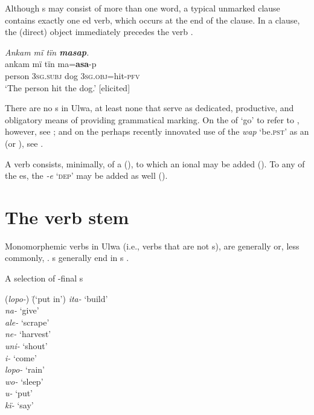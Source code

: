   Although s may consist of more than one word, a typical unmarked  clause contains exactly one ed verb, which occurs at the end of the clause. In a  clause, the  (direct) object immediately precedes the verb .

\ea%
    \label{ex:verbs:1c}
            \textit{Ankam mï tïn \textbf{masap}.}\\
            \gll    ankam  mï      tïn ma=\textbf{asa}-p\\
    person  3\textsc{sg.subj}  dog  3\textsc{sg.obj}=hit-\textsc{pfv}\\
\glt `The person hit the dog.’ [elicited]
\z

  There are no s in Ulwa, at least none that serve as dedicated, productive, and obligatory means of providing grammatical marking. On the  of ‘go’ to refer to  , however, see ; and on the perhaps recently innovated use of the  \textit{wap} ‘be.\textsc{pst’} as an  (or ), see .

  A verb consists, minimally, of a  (), to which an ional   may be added (). To any of the  es, the   \textit{{}-e} ‘\textsc{dep}’ may be added as well ().


\section{The verb stem}\label{sec:4.1}


Monomorphemic verbs in Ulwa (i.e., verbs that are not s), are generally  or, less commonly, . s generally end in s .

\ea%
    \label{ex:verbs:1d}
            A selection of -final s\\
\begin{tabbing}
{(\textit{lopo-})} \= {(‘put in’)}\kill
{\textit{ita-}} \> {‘build’}\\
{\textit{na-}} \> {‘give’}\\
{\textit{ale-}} \> {‘scrape’}\\
{\textit{ne-}} \> {‘harvest’}\\
{\textit{uni-}} \> {‘shout’}\\
{\textit{i-}} \> {‘come’}\\
{\textit{lopo-}} \> {‘rain’}\\
{\textit{wo-}} \> {‘sleep’}\\
{\textit{u-}} \> {‘put’}\\
{\textit{kï-}} \> {‘say’}
\end{tabbing}
 \z

